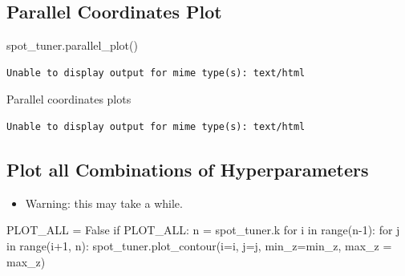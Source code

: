 \documentclass[
  letterpaper,
  DIV=11,
  numbers=noendperiod]{scrreprt}
\newenvironment{Shaded}{\begin{snugshade}}{\end{snugshade}}
\newcommand{\BuiltInTok}[1]{\textcolor[rgb]{0.00,0.23,0.31}{#1}}
\newcommand{\ControlFlowTok}[1]{\textcolor[rgb]{0.00,0.23,0.31}{#1}}
\newcommand{\DecValTok}[1]{\textcolor[rgb]{0.68,0.00,0.00}{#1}}
\newcommand{\KeywordTok}[1]{\textcolor[rgb]{0.00,0.23,0.31}{#1}}
\newcommand{\NormalTok}[1]{\textcolor[rgb]{0.00,0.23,0.31}{#1}}
\newcommand{\OperatorTok}[1]{\textcolor[rgb]{0.37,0.37,0.37}{#1}}
\newcommand{\VariableTok}[1]{\textcolor[rgb]{0.07,0.07,0.07}{#1}}
\providecommand{\tightlist}{%
  \setlength{\itemsep}{0pt}\setlength{\parskip}{0pt}}\usepackage{longtable,booktabs,array}
\begin{document}
\hypertarget{parallel-coordinates-plot-5}{%
\subsection{Parallel Coordinates
Plot}\label{parallel-coordinates-plot-5}}

\begin{Shaded}
\begin{Highlighting}[]
\NormalTok{spot\_tuner.parallel\_plot()}
\end{Highlighting}
\end{Shaded}

\begin{verbatim}
Unable to display output for mime type(s): text/html
\end{verbatim}

Parallel coordinates plots

\begin{verbatim}
Unable to display output for mime type(s): text/html
\end{verbatim}

\hypertarget{plot-all-combinations-of-hyperparameters-6}{%
\subsection{Plot all Combinations of
Hyperparameters}\label{plot-all-combinations-of-hyperparameters-6}}

\begin{itemize}
\tightlist
\item
  Warning: this may take a while.
\end{itemize}

\begin{Shaded}
\begin{Highlighting}[]
\NormalTok{PLOT\_ALL }\OperatorTok{=} \VariableTok{False}
\ControlFlowTok{if}\NormalTok{ PLOT\_ALL:}
\NormalTok{    n }\OperatorTok{=}\NormalTok{ spot\_tuner.k}
    \ControlFlowTok{for}\NormalTok{ i }\KeywordTok{in} \BuiltInTok{range}\NormalTok{(n}\OperatorTok{{-}}\DecValTok{1}\NormalTok{):}
        \ControlFlowTok{for}\NormalTok{ j }\KeywordTok{in} \BuiltInTok{range}\NormalTok{(i}\OperatorTok{+}\DecValTok{1}\NormalTok{, n):}
\NormalTok{            spot\_tuner.plot\_contour(i}\OperatorTok{=}\NormalTok{i, j}\OperatorTok{=}\NormalTok{j, min\_z}\OperatorTok{=}\NormalTok{min\_z, max\_z }\OperatorTok{=}\NormalTok{ max\_z)}
\end{Highlighting}
\end{Shaded}
\end{document}
